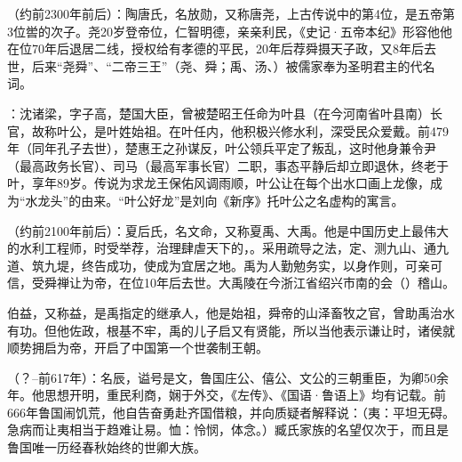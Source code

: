 （约前2300年前后）：陶唐氏，名放勋，又称唐尧，上古传说中的第4位，是五帝第3位喾的次子。尧20岁登帝位，仁智明德，亲亲利民，《史记·五帝本纪》形容他他在位70年后退居二线，授权给有孝德的平民，20年后荐舜摄天子政，又8年后去世，后来“尧舜”、“二帝三王”（尧、舜；禹、汤、）被儒家奉为圣明君主的代名词。

：沈诸梁，字子高，楚国大臣，曾被楚昭王任命为叶县（在今河南省叶县南）长官，故称叶公，是叶姓始祖。在叶任内，他积极兴修水利，深受民众爱戴。前479年（同年孔子去世），楚惠王之孙谋反，叶公领兵平定了叛乱，这时他身兼令尹（最高政务长官）、司马（最高军事长官）二职，事态平静后却立即退休，终老于叶，享年89岁。传说为求龙王保佑风调雨顺，叶公让在每个出水口画上龙像，成为“水龙头”的由来。“叶公好龙”是刘向《新序》托叶公之名虚构的寓言。

（约前2100年前后）：夏后氏，名文命，又称夏禹、大禹。他是中国历史上最伟大的水利工程师，时受举荐，治理肆虐天下的，。采用疏导之法，定、测九山、通九道、筑九堤，终告成功，使成为宜居之地。禹为人勤勉务实，以身作则，可亲可信，受舜禅让为帝，在位10年后去世。大禹陵在今浙江省绍兴市南的会（）稽山。

伯益，又称益，是禹指定的继承人，他是始祖，舜帝的山泽畜牧之官，曾助禹治水有功。但他佐政，根基不牢，禹的儿子启又有贤能，所以当他表示谦让时，诸侯就顺势拥启为帝，开启了中国第一个世袭制王朝。

（？--前617年）：名辰，谥号是文，鲁国庄公、僖公、文公的三朝重臣，为卿50余年。他思想开明，重民利商，娴于外交，《左传》、《国语·鲁语上》均有记载。前666年鲁国闹饥荒，他自告奋勇赴齐国借粮，并向质疑者解释说：（夷：平坦无碍。急病而让夷相当于趋难让易。恤：怜悯，体念。）臧氏家族的名望仅次于，而且是鲁国唯一历经春秋始终的世卿大族。

